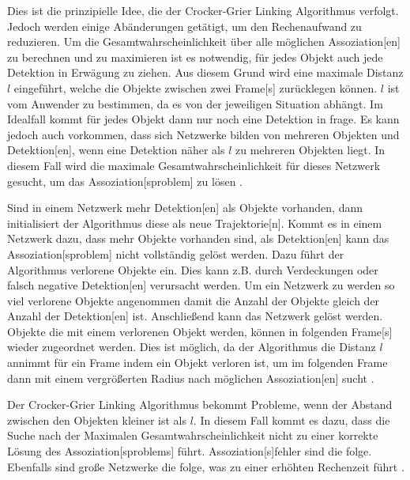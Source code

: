 Dies ist die prinzipielle Idee, die der Crocker-Grier Linking Algorithmus verfolgt. Jedoch werden einige Abänderungen getätigt, um den Rechenaufwand zu reduzieren. Um die Gesamtwahrscheinlichkeit über alle möglichen \gls{Assoziation}[en] zu berechnen und zu maximieren ist es notwendig, für jedes Objekt auch jede \gls{Detektion} in Erwägung zu ziehen. Aus diesem Grund wird eine maximale Distanz \(l\) eingeführt, welche die Objekte zwischen zwei \gls{Frame}[s] zurücklegen können. \(l\) ist vom Anwender zu bestimmen, da es von der jeweiligen Situation abhängt. Im Idealfall kommt für jedes Objekt dann nur noch eine \gls{Detektion} in frage. Es kann jedoch auch vorkommen, dass sich Netzwerke bilden von mehreren Objekten und \gls{Detektion}[en], wenn eine \gls{Detektion} näher als \(l\) zu mehreren Objekten liegt. In diesem Fall wird die maximale Gesamtwahrscheinlichkeit für dieses Netzwerk gesucht, um das \gls{Assoziation}[sproblem] zu lösen \cite{Crocker.1996}. \par

Sind in einem Netzwerk mehr \gls{Detektion}[en] als Objekte vorhanden, dann initialisiert der Algorithmus diese als neue \gls{Trajektorie}[n]. Kommt es in einem Netzwerk dazu, dass mehr Objekte vorhanden sind, als \gls{Detektion}[en] kann das \gls{Assoziation}[sproblem] nicht vollständig gelöst werden. Dazu führt der Algorithmus verlorene Objekte ein. Dies kann z.B. durch Verdeckungen oder falsch negative \gls{Detektion}[en] verursacht werden. Um ein Netzwerk zu  werden so viel verlorene Objekte angenommen damit die Anzahl der Objekte gleich der Anzahl der \gls{Detektion}[en] ist. Anschließend kann das Netzwerk gelöst werden. Objekte die mit einem verlorenen Objekt  werden, können in folgenden \gls{Frame}[s] wieder zugeordnet werden. Dies ist möglich, da der Algorithmus die Distanz \(l\) annimmt für ein \gls{Frame} indem ein Objekt verloren ist, um im folgenden \gls{Frame} dann mit einem vergrößerten Radius nach möglichen \gls{Assoziation}[en] sucht \cite{Crocker.1996}. \par 

Der Crocker-Grier Linking Algorithmus bekommt Probleme, wenn der Abstand zwischen den Objekten kleiner ist als \(l\). In diesem Fall kommt es dazu, dass die Suche nach der Maximalen Gesamtwahrscheinlichkeit nicht zu einer korrekte Lösung des \gls{Assoziation}[sproblems] führt. \gls{Assoziation}[s]fehler sind die folge. Ebenfalls sind große Netzwerke die folge, was zu einer erhöhten Rechenzeit führt \cite{Crocker.1996}. \par

